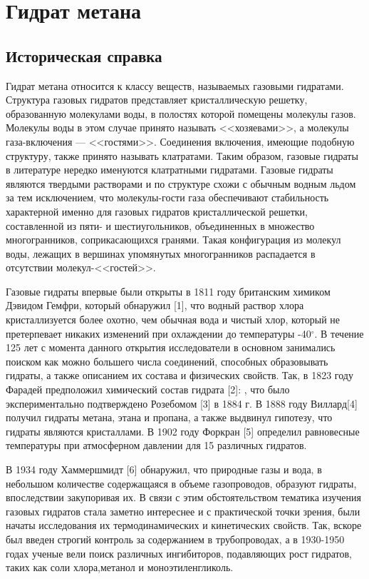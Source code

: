 \chapter{Гидрат метана}
\section{Историческая справка}
\par Гидрат метана относится к классу веществ, называемых газовыми гидратами. Структура газовых гидратов представляет кристаллическую решетку, образованную молекулами воды, в полостях которой помещены молекулы газов. Молекулы воды в этом случае принято называть <<хозяевами>>, а молекулы газа-включения --- <<гостями>>. Соединения включения, имеющие подобную структуру, также принято называть клатратами. Таким образом, газовые гидраты в литературе нередко именуются клатратными гидратами. Газовые гидраты являются твердыми растворами и по структуре схожи с обычным водным льдом за тем исключением, что молекулы-гости газа обеспечивают стабильность характерной именно для газовых гидратов кристаллической решетки, составленной из пяти- и шестиугольников, объединенных в множество многогранников, соприкасающихся гранями. Такая конфигурация из молекул воды, лежащих в вершинах упомянутых многогранников распадается в отсутствии молекул-<<гостей>>.
\par Газовые гидраты впервые были открыты в 1811 году британским химиком Дэвидом Гемфри, который обнаружил [1], что водный раствор хлора кристаллизуется более охотно, чем обычная вода и чистый хлор, который не претерпевает никаких изменений при охлаждении до температуры -40$^{\circ}$. В течение 125 лет с момента данного открытия исследователи в основном занимались поиском как можно большего числа соединений, способных образовывать гидраты, а также описанием их состава и физических свойств. Так, в 1823 году Фарадей предположил химический состав гидрата [2]: , что было экспериментально подтверждено Розебомом [3] в 1884 г. В 1888 году Виллард[4] получил гидраты метана, этана и пропана, а также выдвинул гипотезу, что гидраты являются кристаллами. В 1902 году Форкран [5] определил равновесные температуры при атмосферном давлении для 15 различных гидратов.

\par В 1934 году Хаммершмидт [6] обнаружил, что природные газы и вода, в небольшом количестве содержащаяся в объеме газопроводов, образуют гидраты, впоследствии закупоривая их. В связи с этим обстоятельством тематика изучения газовых гидратов стала заметно интереснее и с практической точки зрения, были начаты исследования их термодинамических и кинетических свойств. Так, вскоре был введен строгий контроль за содержанием  в трубопроводах, а в 1930-1950 годах ученые вели поиск различных ингибиторов, подавляющих рост гидратов, таких как соли хлора,метанол и моноэтиленгликоль.

